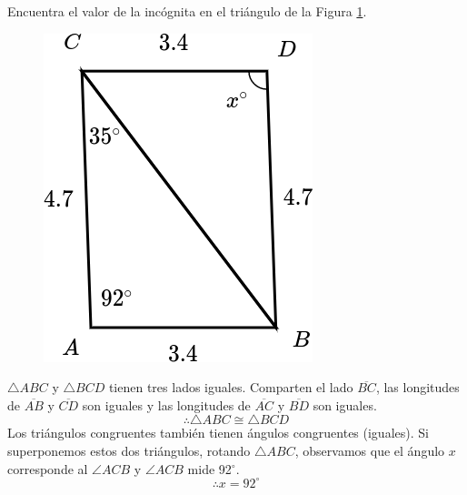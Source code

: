 Encuentra el valor de la incógnita en el triángulo de la Figura \ref{fig:angle_triangle_04}.

\begin{minipage}[t][5cm][b]{0.3\textwidth}
    \begin{figure}[H]
        \centering
        \includegraphics[width=0.65\linewidth]{../images/angle_triangle_04.png}
        \caption{}
        \label{fig:angle_triangle_04}
    \end{figure}
\end{minipage}\hfill
\begin{minipage}[t]{0.65\textwidth}
    \begin{solutionbox}{5cm}
        $\triangle ABC$ y $\triangle BCD$ tienen tres lados iguales. Comparten el lado
        $\overline{BC}$, las longitudes de $\overline{AB}$ y $\overline{CD}$ son iguales y las longitudes de
        $\overline{AC}$ y $\overline{BD}$ son iguales.
        \[\therefore \triangle ABC \cong \triangle BCD\]
        Los triángulos congruentes también tienen ángulos congruentes (iguales). Si superponemos estos dos triángulos, rotando
        $\triangle ABC$, observamos que el ángulo $x$ corresponde al
        $\angle ACB$ y $\angle ACB$ mide
        92$^\circ$.
        \[\therefore x=92^\circ\]
    \end{solutionbox}
\end{minipage}
